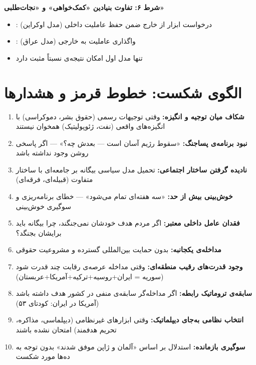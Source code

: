 \begin{tcolorbox}[successbox, title={شرایط لازم برای «مداخله‌ی کمتر بد»}]
\textbf{شرط ۶: تفاوت بنیادین «کمک‌خواهی» و «نجات‌طلبی»}
\begin{itemize}
\item {}: درخواست ابزار از خارج ضمن حفظ عاملیت داخلی (مدل اوکراین)
\item {}: واگذاری عاملیت به خارجی (مدل عراق)
\item تنها مدل اول امکان نتیجه‌ی نسبتاً مثبت دارد
\end{itemize}
\end{tcolorbox}


\section{الگوی شکست: خطوط قرمز و هشدارها}
\label{sec:ch14-failure-pattern}


\begin{tcolorbox}[failbox, title={ده نشانه‌ی هشدار: مداخله‌ای که محکوم به شکست است}]
\begin{enumerate}
\item \textbf{شکاف میان توجیه و انگیزه:} وقتی توجیهات رسمی (حقوق بشر، دموکراسی) با انگیزه‌های واقعی (نفت، ژئوپولیتیک) همخوان نیستند

\item \textbf{نبود برنامه‌ی پساجنگ:} «سقوط رژیم آسان است — بعدش چه؟» — اگر پاسخی روشن وجود نداشته باشد

\item \textbf{نادیده گرفتن ساختار اجتماعی:} تحمیل مدل سیاسی بیگانه بر جامعه‌ای با ساختار متفاوت (قبیله‌ای، فرقه‌ای)

\item \textbf{خوش‌بینی بیش از حد:} «سه هفته‌ای تمام می‌شود» — خطای برنامه‌ریزی و سوگیری خوش‌بینی

\item \textbf{فقدان عامل داخلی معتبر:} اگر مردم هدف خودشان نمی‌جنگند، چرا بیگانه باید برایشان بجنگد؟

\item \textbf{مداخله‌ی یکجانبه:} بدون حمایت بین‌المللی گسترده و مشروعیت حقوقی

\item \textbf{وجود قدرت‌های رقیب منطقه‌ای:} وقتی مداخله عرصه‌ی رقابت چند قدرت شود (سوریه = ایران+روسیه+ترکیه+آمریکا+عربستان)

\item \textbf{سابقه‌ی تروماتیک رابطه:} اگر مداخله‌گر سابقه‌ی منفی در کشور هدف داشته باشد (آمریکا در ایران: کودتای ۵۳)

\item \textbf{انتخاب نظامی به‌جای دیپلماتیک:} وقتی ابزارهای غیرنظامی (دیپلماسی، مذاکره، تحریم هدفمند) امتحان نشده باشند

\item \textbf{سوگیری بازمانده:} استدلال بر اساس «آلمان و ژاپن موفق شدند» بدون توجه به ده‌ها مورد شکست
\end{enumerate}
\end{tcolorbox}


